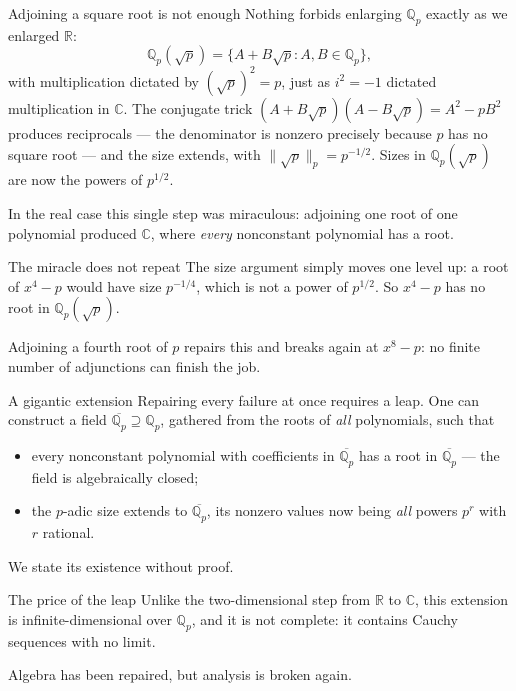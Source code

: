 \documentclass[aspectratio=169,11pt]{beamer}
\newcommand{\Q}{\mathbb Q}
\newcommand{\R}{\mathbb R}
\newcommand{\C}{\mathbb C}
\begin{document}
\begin{frame}{Adjoining a square root is not enough}
  \small
  Nothing forbids enlarging \(\Q_p\) exactly as we enlarged \(\R\):
  \[
    \Q_p(\sqrt p)=\{A+B\sqrt p:A,B\in\Q_p\},
  \]
  with multiplication dictated by \((\sqrt p)^2=p\), just as \(i^2=-1\)
  dictated multiplication in \(\C\).  The conjugate trick
  \((A+B\sqrt p)(A-B\sqrt p)=A^2-pB^2\) produces reciprocals --- the
  denominator is nonzero precisely because \(p\) has no square root ---
  and the size extends, with \(\|\sqrt p\|_p=p^{-1/2}\).  Sizes in
  \(\Q_p(\sqrt p)\) are now the powers of \(p^{1/2}\).

  In the real case this single step was miraculous: adjoining one root of
  one polynomial produced \(\C\), where \emph{every} nonconstant
  polynomial has a root.

  \begin{alertblock}{The miracle does not repeat}
    The size argument simply moves one level up: a root of \(x^4-p\)
    would have size \(p^{-1/4}\), which is not a power of \(p^{1/2}\).
    So \(x^4-p\) has no root in \(\Q_p(\sqrt p)\).
  \end{alertblock}

  Adjoining a fourth root of \(p\) repairs this and breaks again at
  \(x^8-p\): no finite number of adjunctions can finish the job.
\end{frame}

\begin{frame}{A gigantic extension}
  Repairing every failure at once requires a leap.  One can construct a
  field \(\overline{\Q_p}\supseteq\Q_p\), gathered from the roots of
  \emph{all} polynomials, such that
  \begin{itemize}
    \item every nonconstant polynomial with coefficients in
      \(\overline{\Q_p}\) has a root in \(\overline{\Q_p}\) --- the field
      is \alert{algebraically closed};
    \item the \(p\)-adic size extends to \(\overline{\Q_p}\), its nonzero
      values now being \emph{all} powers \(p^r\) with \(r\) rational.
  \end{itemize}
  We state its existence without proof.

  \begin{alertblock}{The price of the leap}
    Unlike the two-dimensional step from \(\R\) to \(\C\), this extension
    is infinite-dimensional over \(\Q_p\), and it is \alert{not
    complete}: it contains Cauchy sequences with no limit.
  \end{alertblock}

  Algebra has been repaired, but analysis is broken again.
\end{frame}
\end{document}

